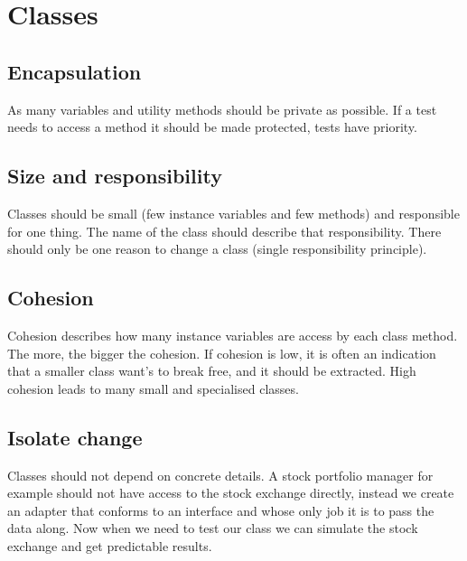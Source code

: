 \section{Classes}

\subsection{Encapsulation}
As many variables and utility methods should be private as possible. If a test needs to access a method it should be made protected, tests have priority.

\subsection{Size and responsibility}
Classes should be small (few instance variables and few methods) and responsible for one thing. The name of the class should describe that responsibility. There should only be one reason to change a class (single responsibility principle).

\subsection{Cohesion}
Cohesion describes how many instance variables are access by each class method. The more, the bigger the cohesion. If cohesion is low, it is often an indication that a smaller class want's to break free, and it should be extracted. High cohesion leads to many small and specialised classes.

\subsection{Isolate change}
Classes should not depend on concrete details. A stock portfolio manager for example should not have access to the stock exchange directly, instead we create an adapter that conforms to an interface and whose only job it is to pass the data along. Now when we need to test our class we can simulate the stock exchange and get predictable results.
